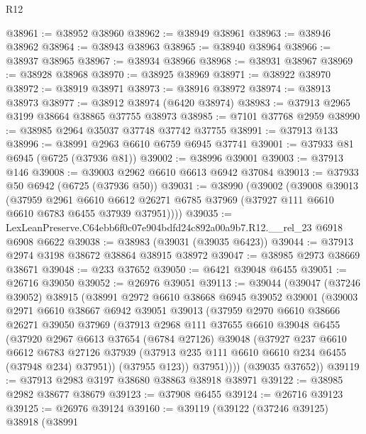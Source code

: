 \begin{lexlean}{R12}
\begin{coremodule}
@38961 := @38952 @38960
@38962 := @38949 @38961
@38963 := @38946 @38962
@38964 := @38943 @38963
@38965 := @38940 @38964
@38966 := @38937 @38965
@38967 := @38934 @38966
@38968 := @38931 @38967
@38969 := @38928 @38968
@38970 := @38925 @38969
@38971 := @38922 @38970
@38972 := @38919 @38971
@38973 := @38916 @38972
@38974 := @38913 @38973
@38977 := @38912 @38974 (@6420 @38974)
@38983 := @37913 @2965 @3199 @38664 @38865 @37755 @38973
@38985 := @7101 @37768 @2959
@38990 := @38985 @2964 @35037 @37748 @37742 @37755
@38991 := @37913 @133
@38996 := @38991 @2963 @6610 @6759 @6945 @37741
@39001 := @37933 @81 @6945 (@6725 (@37936 @81))
@39002 := @38996 @39001
@39003 := @37913 @146
@39008 := @39003 @2962 @6610 @6613 @6942 @37084
@39013 := @37933 @50 @6942 (@6725 (@37936 @50))
@39031 := @38990
    (@39002
      (@39008
        @39013
        (@37959
          @2961
          @6610
          @6612
          @26271
          @6785
          @37969
          (@37927 @111 @6610 @6610 @6783 @6455 @37939 @37951))))
@39035 := LexLeanPreserve.C64ebb6f0c07e904bdfd24c892a00a9b7.R12.__rel_23 @6918 @6908 @6622
@39038 := @38983 (@39031 (@39035 @6423))
@39044 := @37913 @2974 @3198 @38672 @38864 @38915 @38972
@39047 := @38985 @2973 @38669 @38671
@39048 := @233 @37652
@39050 := @6421 @39048 @6455
@39051 := @26716 @39050
@39052 := @26976 @39051
@39113 := @39044
    (@39047
      (@37246 @39052)
      @38915
      (@38991
        @2972
        @6610
        @38668
        @6945
        @39052
        @39001
        (@39003
          @2971
          @6610
          @38667
          @6942
          @39051
          @39013
          (@37959
            @2970
            @6610
            @38666
            @26271
            @39050
            @37969
            (@37913
              @2968
              @111
              @37655
              @6610
              @39048
              @6455
              (@37920
                @2967
                @6613
                @37654
                (@6784 @27126)
                @39048
                (@37927
                  @237
                  @6610
                  @6612
                  @6783
                  @27126
                  @37939
                  (@37913 @235 @111 @6610 @6610 @234 @6455 (@37948 @234) @37951))
                (@37955 @123))
              @37951))))
      (@39035 @37652))
@39119 := @37913 @2983 @3197 @38680 @38863 @38918 @38971
@39122 := @38985 @2982 @38677 @38679
@39123 := @37908 @6455
@39124 := @26716 @39123
@39125 := @26976 @39124
@39160 := @39119
    (@39122
      (@37246 @39125)
      @38918
      (@38991

\end{coremodule}
\end{lexlean}
